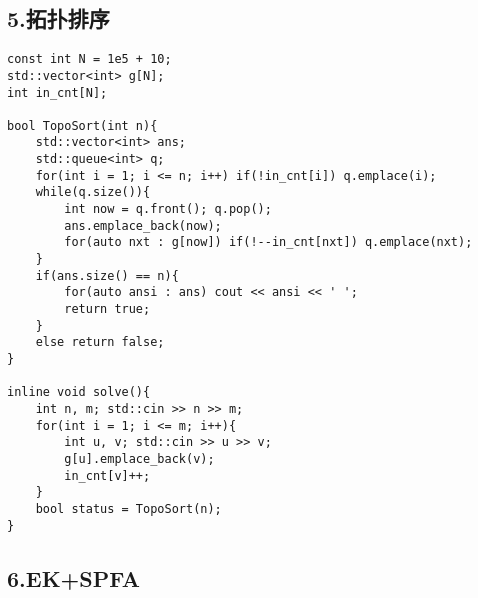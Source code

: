 \documentclass[]{article}
\begin{document}
\hypertarget{ux62d3ux6251ux6392ux5e8f}{%
\subsection{5.拓扑排序}\label{ux62d3ux6251ux6392ux5e8f}}

\begin{verbatim}
const int N = 1e5 + 10;
std::vector<int> g[N];
int in_cnt[N];

bool TopoSort(int n){
    std::vector<int> ans;
    std::queue<int> q;
    for(int i = 1; i <= n; i++) if(!in_cnt[i]) q.emplace(i);
    while(q.size()){
        int now = q.front(); q.pop();
        ans.emplace_back(now);
        for(auto nxt : g[now]) if(!--in_cnt[nxt]) q.emplace(nxt);
    }
    if(ans.size() == n){
        for(auto ansi : ans) cout << ansi << ' ';
        return true;
    }
    else return false;
}

inline void solve(){
    int n, m; std::cin >> n >> m;
    for(int i = 1; i <= m; i++){
        int u, v; std::cin >> u >> v;
        g[u].emplace_back(v);
        in_cnt[v]++;
    }
    bool status = TopoSort(n);
}
\end{verbatim}

\hypertarget{ekspfa}{%
\subsection{6.EK+SPFA}\label{ekspfa}}
\end{document}
